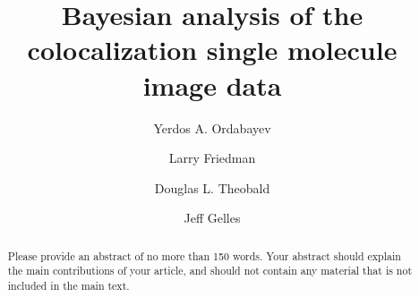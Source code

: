 \documentclass[9pt,lineno]{elife}
\title{Bayesian analysis of the colocalization single molecule image data}
\author[1*]{Yerdos A. Ordabayev}
\author[1,2\authfn{1}\authfn{3}]{Larry Friedman}
\author[2\authfn{1}\authfn{4}]{Douglas L. Theobald}
\author[2*]{Jeff Gelles}
\affil[1]{Brandeis University}
\affil[2]{Institution 2}
\begin{document}
\maketitle

\begin{abstract}
Please provide an abstract of no more than 150 words. Your abstract should explain the main contributions of your article, and should not contain any material that is not included in the main text.
\end{abstract}






%

%

%

%



%
\end{document}
